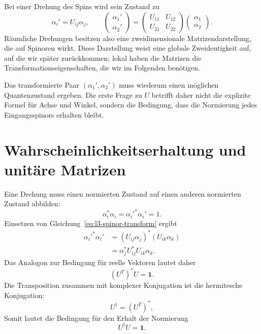 Bei einer Drehung des Spins wird sein Zustand zu
\begin{equation}
\alpha_i'=U_{ij}\alpha_j,
\qquad
\begin{pmatrix}\alpha_1'\\\alpha_2'\end{pmatrix}
=
\begin{pmatrix}
U_{11}&U_{12}\\
U_{21}&U_{22}
\end{pmatrix}
\begin{pmatrix}\alpha_1\\\alpha_2\end{pmatrix}.
\label{eq:l3-spinor-transform}
\end{equation}
Räumliche Drehungen besitzen also eine zweidimensionale Matrizendarstellung, die auf Spinoren wirkt. Diese Darstellung weist eine globale Zweideutigkeit auf, auf die wir später zurückkommen; lokal haben die Matrizen die Transformationseigenschaften, die wir im Folgenden benötigen.

Das transformierte Paar \((\alpha_1',\alpha_2')\) muss wiederum einen möglichen Quantenzustand ergeben. Die erste Frage zu \(U\) betrifft daher nicht die explizite Formel für Achse und Winkel, sondern die Bedingung, dass die Normierung jedes Eingangsspinors erhalten bleibt.

\section{Wahrscheinlichkeitserhaltung und unitäre Matrizen}

Eine Drehung muss einen normierten Zustand auf einen anderen normierten Zustand abbilden:
\begin{equation}
\alpha_i^*\alpha_i=\alpha_i'^*\alpha_i'=1.
\end{equation}
Einsetzen von Gleichung~\eqref{eq:l3-spinor-transform} ergibt
\begin{align}
\alpha_i'^*\alpha_i'
 &=(U_{ij}\alpha_j)^*(U_{ik}\alpha_k)\\
 &=\alpha_j^*U_{ij}^*U_{ik}\alpha_k.
\end{align}
Das Analogon zur Bedingung für reelle Vektoren lautet daher
\begin{equation}
(U^T)^*U=\boldsymbol 1.
\end{equation}
Die Transposition zusammen mit komplexer Konjugation ist die hermitesche Konjugation:
\begin{equation}
U^\dagger=(U^T)^*,
\end{equation}
Somit lautet die Bedingung für den Erhalt der Normierung
\begin{equation}
U^\dagger U=\boldsymbol 1.
\label{eq:l3-unitarity}
\end{equation}

